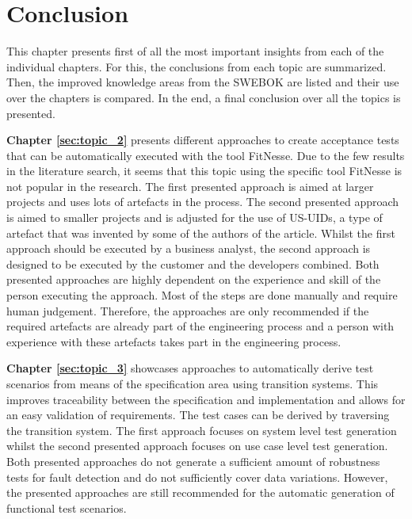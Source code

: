 \chapter{Conclusion} \label{chap:conclusion}

This chapter presents first of all the most important insights from each of the individual chapters. For this, the conclusions from each topic are summarized. Then, the improved knowledge areas from the SWEBOK are listed and their use over the chapters is compared. In the end, a final conclusion over all the topics is presented.

\textbf{Chapter \ref{sec:topic_2}} presents different approaches to create acceptance tests that can be automatically executed with the tool FitNesse. Due to the few results in the literature search, it seems that this topic using the specific tool FitNesse is not popular in the research. The first presented approach \cite{el-attar} is aimed at larger projects and uses lots of artefacts in the process. The second presented approach \cite{longo} is aimed to smaller projects and is adjusted for the use of US-UIDs, a type of artefact that was invented by some of the authors of the article. Whilst the first approach should be executed by a business analyst, the second approach is designed to be executed by the customer and the developers combined.  Both presented approaches are highly dependent on the experience and skill of the person executing the approach. Most of the steps are done manually and require human judgement. Therefore, the approaches are only recommended if the required artefacts are already part of the engineering process and a person with experience with these artefacts takes part in the engineering process.

\textbf{Chapter \ref{sec:topic_3}} showcases approaches to automatically derive test scenarios from means of the specification area using transition systems. This improves traceability between the specification and implementation and allows for an easy validation of requirements. The test cases can be derived by traversing the transition system. The first approach \cite{ClementineNebut2006} focuses on system level test generation whilst the second presented approach \cite{NajlaRaza2007} focuses on use case level test generation. Both presented approaches do not generate a sufficient amount of robustness tests for fault detection and do not sufficiently cover data variations. However, the presented approaches are still recommended for the automatic generation of functional test scenarios.

